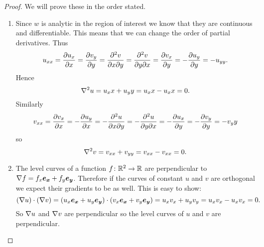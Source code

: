 \documentclass{article}
\begin{document}
    \begin{proof}
        We will prove these in the order stated.
        \begin{enumerate}[label=(\roman*)]
            \item Since \(w\) is analytic in the region of interest we know that they are continuous and differentiable.
            This means that we can change the order of partial derivatives.
            Thus
            \[u_{xx} = \pdv{u_x}{x} = \pdv{v_y}{y} = \frac{\partial^2{v}}{\partial{x}\partial{y}} = \frac{\partial^2{v}}{\partial{y}\partial{x}} = \pdv{v_x}{y} = -\pdv{u_y}{y} = -u_{yy}.\]
            Hence
            \[\nabla^2 u = u_xx + u_yy = u_xx - u_xx = 0.\]
            Similarly
            \[v_{xx} = \pdv{v_x}{x} = -\pdv{u_y}{x} = -\frac{\partial^2{u}}{\partial{x}\partial{y}} = -\frac{\partial^2{u}}{\partial{y}\partial{x}} = -\pdv{u_x}{y} = -\pdv{v_y}{y} = -v_yy\]
            so
            \[\nabla^2 v = v_{xx} + v_{yy} = v_{xx} - v_{xx} = 0.\]
            
            \item The level curves of a function \(f\colon\mathbb{R}^2 \to \mathbb{R}\) are perpendicular to \(\nabla f = f_x\bm{e_{x}} + f_y\bm{e_{y}}\).
            Therefore if the curves of constant \(u\) and \(v\) are orthogonal we expect their gradients to be as well.
            This is easy to show:
            \[(\nabla u) \cdot (\nabla v) = (u_x\bm{e_{x}} + u_y\bm{e_{y}}) \cdot (v_x\bm{e_{x}} + v_y\bm{e_{y}}) = u_xv_x + u_yv_y = u_xv_x - u_xv_x = 0.\]
            So \(\nabla u\) and \(\nabla v\) are perpendicular so the level curves of \(u\) and \(v\) are perpendicular.
            

\end{enumerate}
\end{proof}
\end{document}

